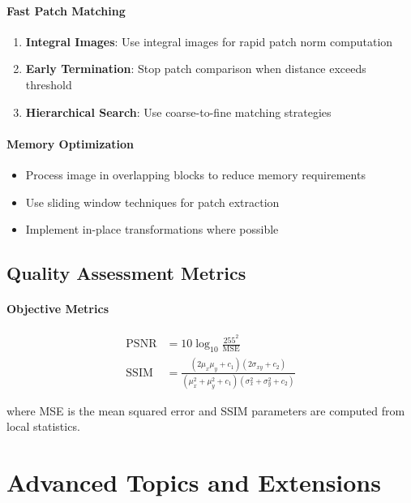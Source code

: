 \documentclass[12pt]{article}
\begin{document}
\paragraph{Fast Patch Matching}
\begin{enumerate}
    \item \textbf{Integral Images}: Use integral images for rapid patch norm computation
    \item \textbf{Early Termination}: Stop patch comparison when distance exceeds threshold
    \item \textbf{Hierarchical Search}: Use coarse-to-fine matching strategies
\end{enumerate}

\paragraph{Memory Optimization}
\begin{itemize}
    \item Process image in overlapping blocks to reduce memory requirements
    \item Use sliding window techniques for patch extraction
    \item Implement in-place transformations where possible
\end{itemize}

\subsection{Quality Assessment Metrics}
\label{subsec:quality_metrics}

\paragraph{Objective Metrics}
\begin{align}
    \text{PSNR} & = 10 \log_{10} \frac{255^2}{\text{MSE}}                                                                    \\
    \text{SSIM} & = \frac{(2\mu_x\mu_y + c_1)(2\sigma_{xy} + c_2)}{(\mu_x^2 + \mu_y^2 + c_1)(\sigma_x^2 + \sigma_y^2 + c_2)}
\end{align}

where MSE is the mean squared error and SSIM parameters are computed from local statistics.

\newpage

\section{Advanced Topics and Extensions}
\label{sec:advanced}
\end{document}
